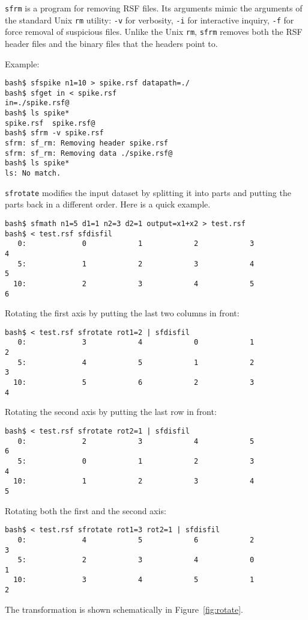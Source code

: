 \noindent\doublebox{\parbox{\textwidth}{
    
  }}

\texttt{sfrm} is a program for removing RSF files. Its arguments mimic
the arguments of the standard Unix \texttt{rm} utility: \texttt{-v}
for verbosity, \texttt{-i} for interactive inquiry, \texttt{-f} for
force removal of suspicious files. Unlike the Unix \texttt{rm},
\texttt{sfrm} removes both the RSF header files and the binary files
that the headers point to. 

Example:
\begin{verbatim}
bash$ sfspike n1=10 > spike.rsf datapath=./
bash$ sfget in < spike.rsf
in=./spike.rsf@
bash$ ls spike*
spike.rsf  spike.rsf@
bash$ sfrm -v spike.rsf
sfrm: sf_rm: Removing header spike.rsf
sfrm: sf_rm: Removing data ./spike.rsf@
bash$ ls spike*
ls: No match.
\end{verbatim}

\noindent\doublebox{\parbox{\textwidth}{
    
  }}


\texttt{sfrotate} modifies the input dataset by splitting it into
parts and putting the parts back in a different order. Here is a quick example.
\begin{verbatim}
bash$ sfmath n1=5 d1=1 n2=3 d2=1 output=x1+x2 > test.rsf
bash$ < test.rsf sfdisfil
   0:             0            1            2            3            4
   5:             1            2            3            4            5
  10:             2            3            4            5            6
\end{verbatim}
Rotating the first axis by putting the last two columns in front:
\begin{verbatim}
bash$ < test.rsf sfrotate rot1=2 | sfdisfil
   0:             3            4            0            1            2
   5:             4            5            1            2            3
  10:             5            6            2            3            4
\end{verbatim}
Rotating the second axis by putting the last row in front:
\begin{verbatim}
bash$ < test.rsf sfrotate rot2=1 | sfdisfil
   0:             2            3            4            5            6
   5:             0            1            2            3            4
  10:             1            2            3            4            5
\end{verbatim}
Rotating both the first and the second axis:
\begin{verbatim}
bash$ < test.rsf sfrotate rot1=3 rot2=1 | sfdisfil
   0:             4            5            6            2            3
   5:             2            3            4            0            1
  10:             3            4            5            1            2
\end{verbatim}
The transformation is shown schematically in Figure~\ref{fig:rotate}.

